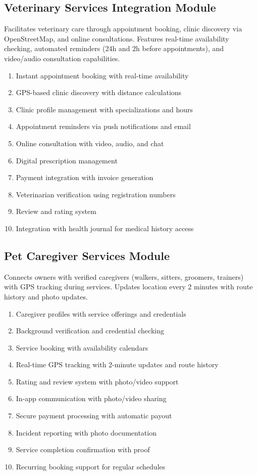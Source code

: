 \subsection{Veterinary Services Integration Module}

Facilitates veterinary care through appointment booking, clinic discovery via OpenStreetMap, and online consultations. Features real-time availability checking, automated reminders (24h and 2h before appointments), and video/audio consultation capabilities.

\begin{enumerate}
    \item Instant appointment booking with real-time availability
    \item GPS-based clinic discovery with distance calculations
    \item Clinic profile management with specializations and hours
    \item Appointment reminders via push notifications and email
    \item Online consultation with video, audio, and chat
    \item Digital prescription management
    \item Payment integration with invoice generation
    \item Veterinarian verification using registration numbers
    \item Review and rating system
    \item Integration with health journal for medical history access
\end{enumerate}

\subsection{Pet Caregiver Services Module}

Connects owners with verified caregivers (walkers, sitters, groomers, trainers) with GPS tracking during services. Updates location every 2 minutes with route history and photo updates.

\begin{enumerate}
    \item Caregiver profiles with service offerings and credentials
    \item Background verification and credential checking
    \item Service booking with availability calendars
    \item Real-time GPS tracking with 2-minute updates and route history
    \item Rating and review system with photo/video support
    \item In-app communication with photo/video sharing
    \item Secure payment processing with automatic payout
    \item Incident reporting with photo documentation
    \item Service completion confirmation with proof
    \item Recurring booking support for regular schedules
\end{enumerate}

